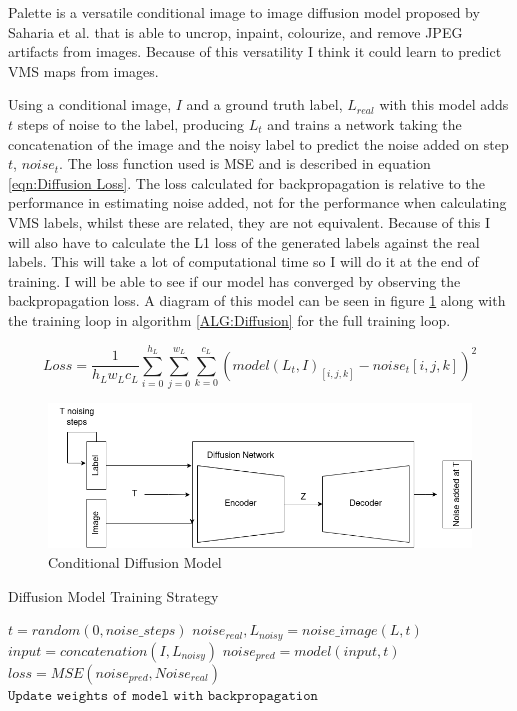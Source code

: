 \documentclass{UoYCSproject}
\begin{document}
Palette is a versatile conditional image to image diffusion model proposed by Saharia et al. \cite{saharia2022palette} that is able to uncrop, inpaint, colourize, and remove JPEG artifacts from images. Because of this versatility I think it could learn to predict VMS maps from images. 

Using a conditional image, $I$ and a ground truth label, $L_{real}$ with this model adds $t$ steps of noise to the label, producing $L_{t}$ and trains a network taking the concatenation of the image and the noisy label to predict the noise added on step $t$, $noise_t$. The loss function used is MSE and is described in equation \ref{eqn:Diffusion Loss}. The loss calculated for backpropagation is relative to the performance in estimating noise added, not for the performance when calculating VMS labels, whilst these are related, they are not equivalent. Because of this I will also have to calculate the L1 loss of the generated labels against the real labels. This will take a lot of computational time so I will do it at the end of training. I will be able to see if our model has converged by observing the backpropagation loss. A diagram of this model can be seen in figure \ref{fig:DiffusionDiagram} along with the training loop in algorithm \ref{ALG:Diffusion} for the full training loop.

\begin{equation}
    \label{eqn:Diffusion Loss}
    Loss = \frac{1}{h_Lw_Lc_L} \sum_{i=0}^{h_L} \sum_{j=0}^{w_L} \sum_{k=0}^{c_L} (model(L_{t}, I)_{[i,j,k]} - noise_t[i,j,k] )^2
\end{equation}

\begin{figure}[ht]
    \centering
    \includegraphics[width=\linewidth]{Diffusion Model}
    \caption{Conditional Diffusion Model}
    \label{fig:DiffusionDiagram}
\end{figure}

\begin{algorithm}
\caption{Diffusion Model Training Strategy}\label{ALG:Diffusion}
\begin{algorithmic}[1]
\State
\State $t = random(0, noise\_steps)$
\State $noise_{real}, L_{noisy} = noise\_image(L, t)$ 
\State
\State $input = concatenation(I, L_{noisy})$
\State $noise_{pred} = model(input, t)$
\State $loss = MSE( noise_{pred}, Noise_{real} )$
\State $\texttt{Update weights of model with backpropagation}$
\EndFor
\EndFor
\end{algorithmic}
\end{algorithm}
\end{document}
